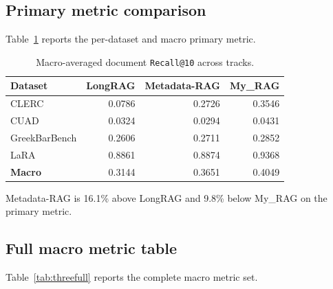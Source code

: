 \documentclass[11pt,a4paper]{article}
\begin{document}
\subsection{Primary metric comparison}
Table~\ref{tab:three} reports the per-dataset and macro primary
metric.

\begin{table}[h]
\centering
\caption{Macro-averaged document \texttt{Recall@10} across tracks.}
\label{tab:three}
\small
\begin{tabular}{l r r r}
\toprule
\textbf{Dataset} & \textbf{LongRAG} & \textbf{Metadata-RAG}
  & \textbf{My\_RAG} \\
\midrule
CLERC              & \num{0.0786} & \num{0.2726} & \num{0.3546} \\
CUAD               & \num{0.0324} & \num{0.0294} & \num{0.0431} \\
GreekBarBench      & \num{0.2606} & \num{0.2711} & \num{0.2852} \\
LaRA               & \num{0.8861} & \num{0.8874} & \num{0.9368} \\
\midrule
\textbf{Macro}     & \num{0.3144} & \num{0.3651} & \num{0.4049} \\
\bottomrule
\end{tabular}
\end{table}

Metadata-RAG is \num{16.1}\% above LongRAG and \num{9.8}\% below
My\_RAG on the primary metric.

\subsection{Full macro metric table}
Table~\ref{tab:threefull} reports the complete macro metric set.
\end{document}
